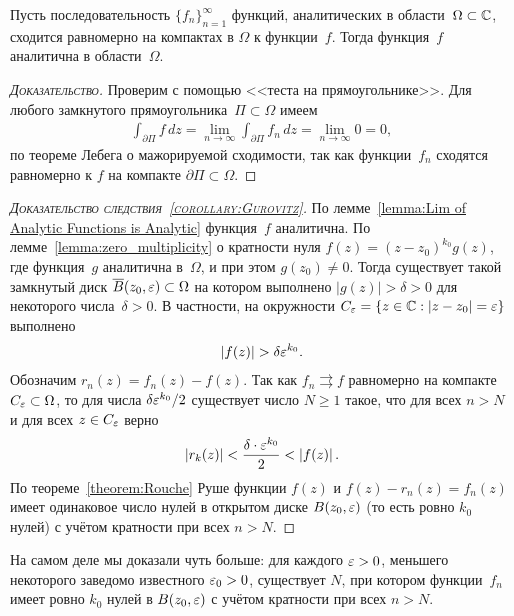 \documentclass[../complex-analysis.tex]{subfiles}
\begin{document}
\begin{lm}
 \label{lemma:Lim of Analytic Functions is Analytic}
 Пусть последовательность $ \{f_{n}\}_{n=1}^{\infty}  $ функций, аналитических в области~$ \Omega \subset \mathbb{C} $, сходится равномерно на компактах в $ \Omega $ к функции~$ f $. Тогда функция~$ f $ аналитична в области~$ \Omega $.
\end{lm}
\begin{proof}[\normalfont\textsc{Доказательство}]
 Проверим с помощью <<теста на прямоугольнике>>. Для любого замкнутого прямоугольника~$ \Pi \subset \Omega $ имеем
 \begin{align*}
  \int_{\partial\Pi} f\,dz = \lim_{n \to \infty} \int_{\partial\Pi} f_n\,dz = \lim_{n \to \infty} 0 = 0,
 \end{align*} по теореме Лебега о мажорируемой сходимости, так как функции~$ f_n $ сходятся равномерно к $ f $ на компакте $ \partial\Pi \subset \Omega $.
\end{proof}

\begin{proof}[\normalfont\textsc{Доказательство следствия~\ref{corollary:Gurovitz}}]
 По лемме~\ref{lemma:Lim of Analytic Functions is Analytic} функция~$ f $ аналитична. По лемме~\ref{lemma:zero_multiplicity} о кратности нуля $ f(z) = (z - z_0)^{k_0}g(z) $, где функция~$ g $ аналитична в~$ \Omega $, и при этом $ g(z_0) \neq 0 $. Тогда существует такой замкнутый диск $ \overline B(z_0, \varepsilon) \subset \Omega $ на котором выполнено $\left| g(z) \right| > \delta > 0$ для некоторого числа~$ \delta>0 $. В частности, на окружности $ C_\varepsilon = \left\{ z \in \mathbb{C} : \left| z-z_0 \right|=\varepsilon \right\} $ выполнено
 \begin{align*}
  \left|f(z) \right| > \delta \varepsilon^{k_0}.
 \end{align*} Обозначим $ r_n(z) = f_n(z) - f(z) $. Так как $ f_n \rightrightarrows f $ равномерно на компакте~$ C_\varepsilon \subset \Omega $, то для числа $ \delta \varepsilon^{k_0} / 2 $ существует число $ N \geqslant 1 $ такое, что для всех $ n > N $ и для всех $ z \in C_\varepsilon $ верно
 \begin{align*}
  \left|r_k(z) \right| < \frac{\delta \cdot \varepsilon^{k_0}}{2} < \left| f(z) \right|.
 \end{align*} По теореме~\ref{theorem:Rouche} Руше функции $ f(z) $ и $ f(z) - r_n(z) = f_n(z) $ имеет одинаковое число нулей в открытом диске $ B(z_0,\varepsilon) $ (то есть ровно $ k_0 $ нулей) с учётом кратности при всех $ n > N $.
\end{proof}

На самом деле мы доказали чуть больше: для каждого $ \varepsilon > 0 $, меньшего некоторого заведомо известного $ \varepsilon_0 > 0 $, существует $ N $, при котором функции~$ f_n $ имеет ровно $ k_0 $ нулей в $ B(z_0,\varepsilon) $ с учётом кратности при всех $ n > N $.
\end{document}
